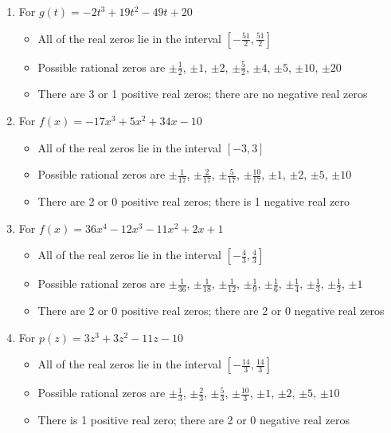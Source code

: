 \begin{enumerate}
\item For   $g(t) = -2t^{3} + 19t^{2} - 49t + 20$
\begin{itemize}
\item  All of the real zeros lie in the interval $\left[-\frac{51}{2},\frac{51}{2} \right]$
\item  Possible rational zeros are  $\pm \frac{1}{2}$, $\pm 1$, $\pm 2$, $\pm \frac{5}{2}$, $\pm 4$, $\pm 5$, $\pm 10$, $\pm 20$ 
\item  There are 3 or 1 positive real zeros;  there are no negative real zeros
\end{itemize}

\item For   $f(x) = -17x^{3} + 5x^{2} + 34x - 10$
\begin{itemize}
\item  All of the real zeros lie in the interval $[-3,3]$
\item  Possible rational zeros are $\pm \frac{1}{17}$, $\pm \frac{2}{17}$, $\pm \frac{5}{17}$, $\pm \frac{10}{17}$, $\pm 1$, $\pm 2$, $\pm 5$, $\pm 10$
\item  There are 2 or 0 positive real zeros;  there is 1 negative real zero
\end{itemize}

\item For   $f(x) = 36x^{4} - 12x^{3} - 11x^{2} + 2x + 1$
\begin{itemize}
\item  All of the real zeros lie in the interval $\left[-\frac{4}{3},\frac{4}{3}\right]$
\item  Possible rational zeros are $\pm \frac{1}{36}$, $\pm \frac{1}{18}$, $\pm \frac{1}{12}$, $\pm \frac{1}{9}$, $\pm \frac{1}{6}$, $\pm \frac{1}{4}$, $\pm \frac{1}{3}$, $\pm \frac{1}{2}$, $\pm 1$
\item  There are 2 or 0 positive real zeros;  there are 2 or 0 negative real zeros
\end{itemize}

\item For   $p(z) = 3z^{3} + 3z^{2} - 11z - 10$
\begin{itemize}
\item  All of the real zeros lie in the interval $\left[-\frac{14}{3},\frac{14}{3}\right]$
\item  Possible rational zeros are $\pm \frac{1}{3}$, $\pm \frac{2}{3}$, $\pm \frac{5}{3}$, $\pm \frac{10}{3}$, $\pm 1$, $\pm 2$, $\pm 5$, $\pm 10$
\item  There is 1 positive real zero;  there are 2 or 0 negative real zeros
\end{itemize}


\end{enumerate}
